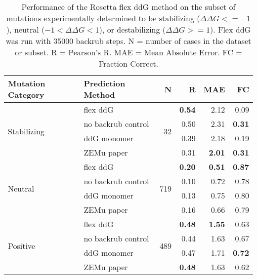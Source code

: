 \begin{table}
  \begin{tabular}{llrrrr}
\toprule
Mutation Category &   Prediction Method &    N &    R &  MAE &   FC \\
\midrule
 \multirow{ 4}{*}{Stabilizing} & flex ddG & \multirow{ 4}{*}{32} & \textbf{0.54} & 2.12 & 0.09  \\
 & no backrub control & & 0.50 & 2.31 & \textbf{0.31}  \\
 & ddG monomer & & 0.39 & 2.18 & 0.19  \\
 & ZEMu paper & & 0.31 & \textbf{2.01} & \textbf{0.31}  \\
\hline
 \multirow{ 4}{*}{Neutral} & flex ddG & \multirow{ 4}{*}{719} & \textbf{0.20} & \textbf{0.51} & \textbf{0.87}  \\
 & no backrub control & & 0.10 & 0.72 & 0.78  \\
 & ddG monomer & & 0.13 & 0.75 & 0.80  \\
 & ZEMu paper & & 0.16 & 0.66 & 0.79  \\
\hline
 \multirow{ 4}{*}{Positive} & flex ddG & \multirow{ 4}{*}{489} & \textbf{0.48} & \textbf{1.55} & 0.63  \\
 & no backrub control & & 0.44 & 1.63 & 0.67  \\
 & ddG monomer & & 0.47 & 1.71 & \textbf{0.72}  \\
 & ZEMu paper & & \textbf{0.48} & 1.63 & 0.62  \\
\bottomrule
\end{tabular}
  \caption[Flex ddG performance on stabilizing mutations]{
    Performance of the Rosetta flex ddG method on the subset of mutations experimentally determined to be stabilizing ($\Delta\Delta G <= -1$), neutral ($-1 < \Delta\Delta G < 1$), or destabilizing ($\Delta\Delta G >= 1$). Flex ddG was run with 35000 backrub steps. N = number of cases in the dataset or subset. R = Pearson's R. MAE = Mean Absolute Error. FC = Fraction Correct.
  } \label{tab:table-stabilizing}
\end{table}

